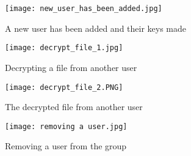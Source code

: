 \documentclass{report}
\begin{document}
	\begin{figure}[h!]
		\texttt{[image: new\_user\_has\_been\_added.jpg]}
		\caption{A new user has been added and their keys made}
	\end{figure} 

 	\begin{figure}[h!]
		\texttt{[image: decrypt\_file\_1.jpg]}
		\caption{Decrypting a file from another user}
	\end{figure} 

	\begin{figure}[h!]
		\texttt{[image: decrypt\_file\_2.PNG]}
		\caption{The decrypted file from another user}
	\end{figure} 

 	\begin{figure}[h!]
		\texttt{[image: removing a user.jpg]}
		\caption{Removing a user from the group}
	\end{figure}
\end{document}

